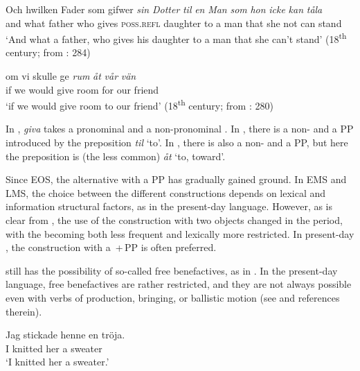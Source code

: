 \documentclass[output=paper]{langscibook}
\begin{document}
\ex\label{ex:intro:22b}
\gll  Och hwilken Fader som gifwer \textit{sin} \textit{Dotter} \textit{til} \textit{en} \textit{Man} \textit{som} \textit{hon} \textit{icke} \textit{kan} \textit{tåla}\\
      and   what    father   who gives     \textsc{poss.refl}  daughter     to   a   man that she   not   can  stand\\
\glt  `And what a father, who gives his daughter to a man that she can’t stand’ (18\textsuperscript{th} century; from \citealt{Valdeson2016}: 284)


\ex \label{ex:intro:22c}
\gll  om   vi     skulle   ge \textit{rum} \textit{åt} \textit{vår} \textit{vän}\\
      if     we   would   give   room for   our   friend\\
    \glt `if we would give room to our friend’ (18\textsuperscript{th} century; from \citealt{Valdeson2016}: 280)
\z
\z

In , \textit{giva} takes a pronominal  and a non-pronominal . In , there is a non- and a PP introduced by the preposition \textit{til} ‘to’. In , there is also a non- and a PP, but here the preposition is (the less common) \textit{åt} ‘to, toward’.



Since EOS, the alternative with a PP has gradually gained ground. In EMS and LMS, the choice between the different constructions depends on lexical and information structural factors, as in the present-day language. However, as is clear from , the use of the construction with two objects changed in the  period, with the  becoming both less frequent and lexically more restricted. In present-day , the construction with a \,+\,PP is often preferred. 



 still has the possibility of so-called free benefactives, as in . In the present-day language, free benefactives are rather restricted, and they are not always possible even with verbs of production, bringing, or ballistic motion (see \citealt{Lundquist2014Double} and references therein).


\ea\label{ex:intro:23}
\gll  Jag   stickade  henne   en   tröja. \\
I         knitted   her     a     sweater\\
\glt ‘I knitted her a sweater.’
\z
\end{document}
